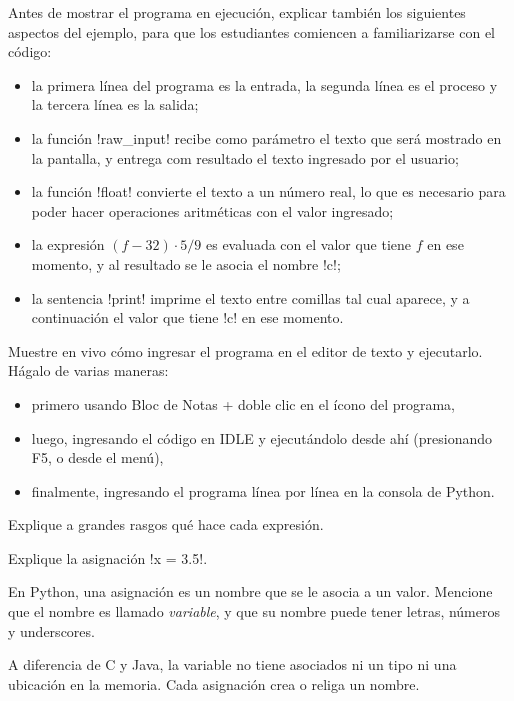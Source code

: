 \documentclass[10pt]{article}
\begin{document}
  Antes de mostrar el programa en ejecución,
  explicar también los siguientes aspectos del ejemplo,
  para que los estudiantes comiencen a familiarizarse con el código:
  \begin{itemize}
    \item la primera línea del programa es la entrada,
      la segunda línea es el proceso
      y la tercera línea es la salida;
    \item la función \li!raw_input! recibe como parámetro
      el texto que será mostrado en la pantalla,
      y entrega com resultado el texto ingresado por el usuario;
    \item la función \li!float! convierte el texto a un número real,
      lo que es necesario para poder hacer operaciones aritméticas
      con el valor ingresado;
    \item la expresión \((f - 32)\cdot 5/9\)
      es evaluada con el valor que tiene \(f\) en ese momento,
      y al resultado se le asocia el nombre \li!c!;
    \item la sentencia \li!print!
      imprime el texto entre comillas tal cual aparece,
      y a continuación el valor que tiene \li!c! en ese momento.
  \end{itemize}

  Muestre en vivo cómo ingresar el programa en el editor de texto y ejecutarlo.
  Hágalo de varias maneras:
  \begin{itemize}
    \item primero usando Bloc de Notas + doble clic en el ícono del programa,
    \item luego, ingresando el código en IDLE y ejecutándolo desde ahí
      (presionando F5, o desde el menú),
    \item finalmente,
      ingresando el programa línea por línea en la consola de Python.
  \end{itemize}

  
  Explique a grandes rasgos qué hace cada expresión.

  Explique la asignación \li!x = 3.5!.

  En Python, una asignación es un nombre que se le asocia a un valor.
  Mencione que el nombre es llamado \emph{variable},
  y que su nombre puede tener letras, números y underscores.

  A diferencia de C y Java,
  la variable no tiene asociados ni un tipo ni una ubicación en la memoria.
  Cada asignación crea o religa un nombre.
\end{document}
